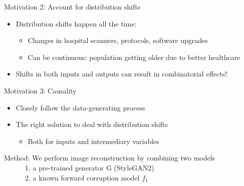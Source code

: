 \begin{frame}{Motivation 2: Account for distribution shifts}


\begin{itemize}
 \item Distribution shifts happen all the time:
 \begin{itemize}
 \item Changes in hospital scanners, protocols, software upgrades
 \item Can be continuous: population getting older due to better healthcare
\end{itemize}

\vspace{2em} 
 \item Shifts in both inputs and outputs can result in combinatorial effects!
\end{itemize}

\begin{center}
\end{center}
 
\end{frame}


\begin{frame}{Motivation 3: Causality}


\begin{itemize}
 \item Closely follow the data-generating process
 \item The right solution to deal with distribution shifts
 \begin{itemize}
 \item Both for inputs and intermediary variables
\end{itemize}
\end{itemize}


\begin{center}
\end{center}
 
\end{frame}


\begin{frame}{Method: We perform image reconstruction by combining two models\\
\ \ \ \ \ \  1. a pre-trained generator G (StyleGAN2)\\
\ \ \ \ \ \  2. a known forward corruption model $f_1$
}


\vt
{}
 
\end{frame}


